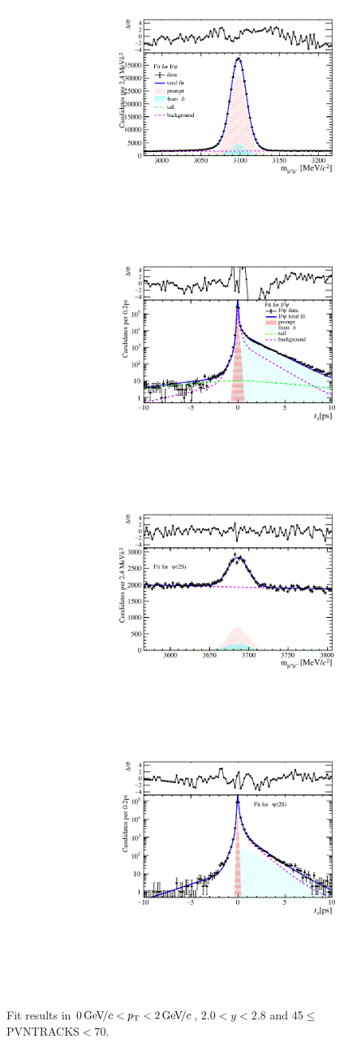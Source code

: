 \begin{figure}[H]
\begin{center}
\includegraphics[width=0.47\linewidth]{pdf/Jpsi/drawmass/n3y1pt1.pdf}
\includegraphics[width=0.47\linewidth]{pdf/Jpsi/2DFit/n3y1pt1.pdf}
\vspace*{-0.5cm}
\includegraphics[width=0.47\linewidth]{pdf/Psi2S/drawmass/n3y1pt1.pdf}
\includegraphics[width=0.47\linewidth]{pdf/Psi2S/2DFit/n3y1pt1.pdf}
\vspace*{-0.5cm}
\end{center}
\caption{Fit results in $0\text{\,Ge\kern -0.1em V\!/}c<p_{\mathrm{T}}<2\text{\,Ge\kern -0.1em V\!/}c$, $2.0<y<2.8$ and 45$\leq$PVNTRACKS$<$70.}
\label{Fitn3y1pt1}
\end{figure}
